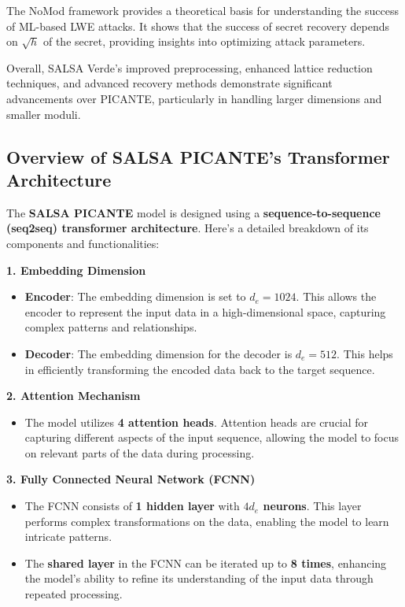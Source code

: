 \documentclass{article}
\begin{document}
The NoMod framework provides a theoretical basis for understanding the success of ML-based LWE attacks. It shows that the success of secret recovery depends on \( \sqrt{h} \) of the secret, providing insights into optimizing attack parameters.

Overall, SALSA Verde's improved preprocessing, enhanced lattice reduction techniques, and advanced recovery methods demonstrate significant advancements over PICANTE, particularly in handling larger dimensions and smaller moduli.


\subsection*{Overview of SALSA PICANTE's Transformer Architecture}

The \textbf{SALSA PICANTE} model is designed using a \textbf{sequence-to-sequence (seq2seq) transformer architecture}. Here's a detailed breakdown of its components and functionalities:

\textbf{1. Embedding Dimension}
\begin{itemize}
    \item \textbf{Encoder}: The embedding dimension is set to \(d_e = 1024\). This allows the encoder to represent the input data in a high-dimensional space, capturing complex patterns and relationships.
    \item \textbf{Decoder}: The embedding dimension for the decoder is \(d_e = 512\). This helps in efficiently transforming the encoded data back to the target sequence.
\end{itemize}

\textbf{2. Attention Mechanism}
\begin{itemize}
    \item The model utilizes \textbf{4 attention heads}. Attention heads are crucial for capturing different aspects of the input sequence, allowing the model to focus on relevant parts of the data during processing.
\end{itemize}

\textbf{3. Fully Connected Neural Network (FCNN)}
\begin{itemize}
    \item The FCNN consists of \textbf{1 hidden layer} with \textbf{\(4d_e\) neurons}. This layer performs complex transformations on the data, enabling the model to learn intricate patterns.
    \item The \textbf{shared layer} in the FCNN can be iterated up to \textbf{8 times}, enhancing the model's ability to refine its understanding of the input data through repeated processing.
\end{itemize}
\end{document}
